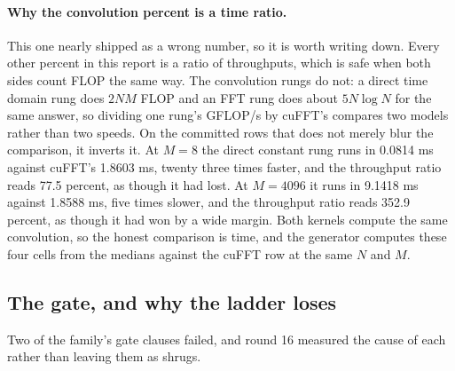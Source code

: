 \begin{table}[htbp]
\centering

\caption{The FFT and convolution rungs, measured at locked clocks. Traffic models
are derived and stated in \texttt{docs/fft.md}. Each row is its canonical row at
the largest size that rung was swept at, which for the convolution rungs means the
largest filter length, so those four rows are not at a common $M$ and are not
comparable with each other; Figure \ref{fig:conv} carries the $M$ dependence. For
the convolution rows the percent is a ratio of wall times rather than of
throughputs, for the reason below.}
\label{tab:fft}
\end{table}

\paragraph{Why the convolution percent is a time ratio.} This one nearly shipped
as a wrong number, so it is worth writing down. Every other percent in this report
is a ratio of throughputs, which is safe when both sides count FLOP the same way.
The convolution rungs do not: a direct time domain rung does $2NM$ FLOP and an FFT
rung does about $5N\log N$ for the same answer, so dividing one rung's GFLOP/s by
cuFFT's compares two models rather than two speeds. On the committed rows that
does not merely blur the comparison, it inverts it. At $M = 8$ the direct constant
rung runs in 0.0814 ms against cuFFT's 1.8603 ms, twenty three times faster, and
the throughput ratio reads 77.5 percent, as though it had lost. At $M = 4096$ it
runs in 9.1418 ms against 1.8588 ms, five times slower, and the throughput ratio
reads 352.9 percent, as though it had won by a wide margin. Both kernels compute
the same convolution, so the honest comparison is time, and the generator computes
these four cells from the medians against the cuFFT row at the same $N$ and $M$.

\subsection{The gate, and why the ladder loses}
\label{sec:fftgate}

Two of the family's gate clauses failed, and round 16 measured the cause of each
rather than leaving them as shrugs.

